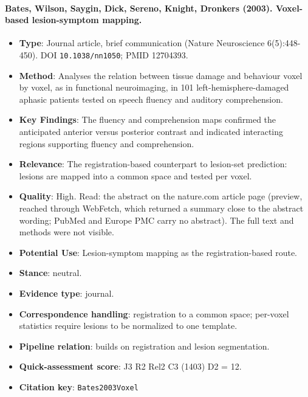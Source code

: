 \documentclass[journal,onecolumn]{IEEEtran}
\begin{document}
\paragraph{Bates, Wilson, Saygin, Dick, Sereno, Knight, Dronkers (2003). Voxel-based lesion-symptom mapping.~\cite{Bates2003Voxel}}\mbox{}

\begin{itemize}

\item{} \textbf{Type}: Journal article, brief communication (Nature Neuroscience 6(5):448-450). DOI \nolinkurl{10.1038/nn1050}; PMID 12704393.

\item{} \textbf{Method}: Analyses the relation between tissue damage and behaviour voxel by voxel, as in functional neuroimaging, in 101 left-hemisphere-damaged aphasic patients tested on speech fluency and auditory comprehension.

\item{} \textbf{Key Findings}: The fluency and comprehension maps confirmed the anticipated anterior versus posterior contrast and indicated interacting regions supporting fluency and comprehension.

\item{} \textbf{Relevance}: The registration-based counterpart to lesion-set prediction: lesions are mapped into a common space and tested per voxel.

\item{} \textbf{Quality}: High. Read: the abstract on the nature.com article page (preview, reached through WebFetch, which returned a summary close to the abstract wording; PubMed and Europe PMC carry no abstract). The full text and methods were not visible.

\item{} \textbf{Potential Use}: Lesion-symptom mapping as the registration-based route.

\item{} \textbf{Stance}: neutral.

\item{} \textbf{Evidence type}: journal.

\item{} \textbf{Correspondence handling}: registration to a common space; per-voxel statistics require lesions to be normalized to one template.

\item{} \textbf{Pipeline relation}: builds on registration and lesion segmentation.

\item{} \textbf{Quick-assessment score}: J3 R2 Rel2 C3 (1403) D2 = 12.

\item{} \textbf{Citation key}: \texttt{Bates2003Voxel}

\end{itemize}
\end{document}
